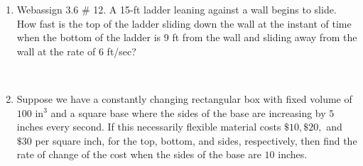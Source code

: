 \documentclass[reqno,psamsfonts]{amsart}
\theoremstyle{definition}
\theoremstyle{remark}
\numberwithin{equation}{section}
\begin{document}
\begin{enumerate}
\item Webassign 3.6 \# 12. A 15-ft ladder leaning against a wall begins to slide. How fast is the top of the ladder sliding down the wall at the instant of time when the bottom of the ladder is 9 ft from the wall and sliding away from the wall at the rate of 6 ft/sec?
\\
\begin{center}
\end{center}
\\
\item Suppose we have a constantly changing rectangular box with fixed volume of $100\text{ in}^3$ and a square base where the sides of the base are increasing by $5$ inches every second. If this necessarily flexible material costs $\$10, \$20,$ and $\$30$ per square inch, for the top, bottom, and sides, respectively, then find the rate of change of the cost when the sides of the base are $10$ inches.

\end{enumerate}
\end{document}
